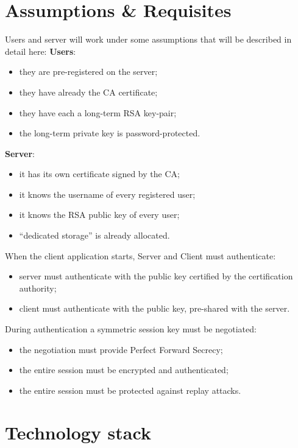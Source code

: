 \section{Assumptions \& Requisites}
Users and server will work under some assumptions that will be described in detail here: \newline{}
\textbf{Users}: 
\begin{itemize}
	\item they are pre-registered on the server;
	\item they have already the CA certificate;
	\item they have each a long-term RSA key-pair;
	\item the long-term private key is password-protected.
\end{itemize}
\textbf{Server}:
\begin{itemize}
	\item it has its own certificate signed by the CA;
	\item it knows the username of every registered user;
	\item it knows the RSA public key of every user;
	\item ``dedicated storage'' is already allocated.
\end{itemize}
When the client application starts, Server and Client must authenticate: \newline{}
\begin{itemize}
	\item server must authenticate with the public key certified by the certification authority;
	\item client must authenticate with the public key, pre-shared with the server.
\end{itemize}

During authentication a symmetric session key must be negotiated: \newline{}
\begin{itemize}
	\item the negotiation must provide Perfect Forward Secrecy;
	\item the entire session must be encrypted and authenticated;
	\item the entire session must be protected against replay attacks.
	
\end{itemize}

\section{Technology stack}

